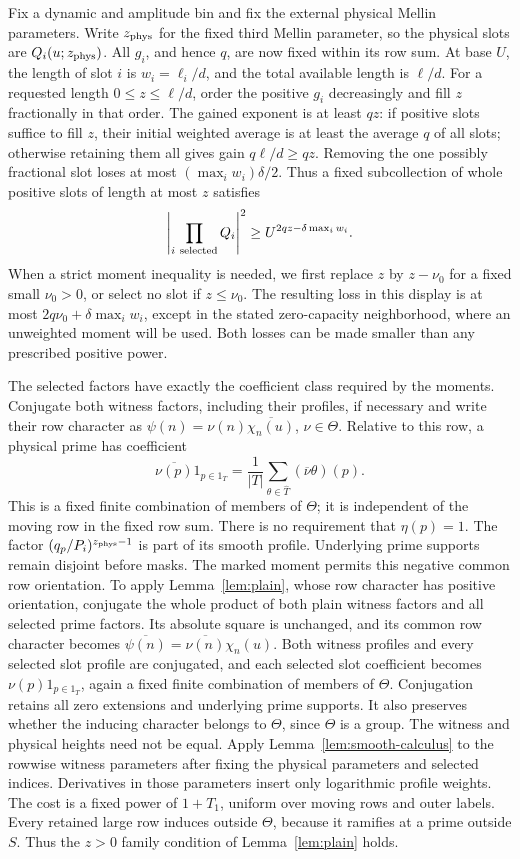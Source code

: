 \documentclass[11pt,a4paper]{article}
\numberwithin{equation}{section}
\numberwithin{figure}{section}
\theoremstyle{definition}
\theoremstyle{remark}
\begin{document}
Fix a dynamic and amplitude bin and fix the external physical
Mellin parameters.  Write \(z_{\rm phys}\) for the fixed third Mellin
parameter, so the physical slots are \(Q_i(u;z_{\rm phys})\).
All \(g_i\), and hence \(q\), are now fixed
within its row sum.  At base \(U\), the length of slot \(i\) is
\(w_i=\ell_i/d\), and the total available length is \(\ell/d\).
For a requested length \(0\le z\le\ell/d\), order the positive
\(g_i\) decreasingly and fill \(z\) fractionally in that order.
The gained exponent is at least \(qz\): if positive slots suffice
to fill \(z\), their initial weighted average is at least the
average \(q\) of all slots; otherwise retaining them all gives
gain \(q\ell/d\ge qz\).  Removing the one possibly fractional
slot loses at most \((\max_i w_i)\delta/2\).  Thus a fixed
subcollection of whole positive slots of length at most \(z\)
satisfies
\[
 \left|\prod_{i\ {\rm selected}}Q_i\right|^2
 \ge U^{2qz-\delta\max_iw_i}.
\]
When a strict moment inequality is needed, we first replace \(z\)
by \(z-\nu_0\) for a fixed small \(\nu_0>0\), or select no slot if
\(z\le\nu_0\).  The resulting loss in this display is at most
\(2q\nu_0+\delta\max_iw_i\), except in the stated zero-capacity
neighborhood, where an unweighted moment will be used.  Both losses
can be made smaller than any prescribed positive power.

The selected factors have exactly the coefficient class required
by the moments.  Conjugate both witness factors, including their
profiles, if necessary and write their row character as
\(\psi(n)=\nu(n)\overline{\chi_n(u)}\), \(\nu\in\Theta\).
Relative to this row, a physical prime has coefficient
\[
 \overline{\nu(p)}1_{p\in1_T}
 =\frac1{|T|}\sum_{\theta\in\widehat T}
       (\overline{\nu}\theta)(p).
\]
This is a fixed finite combination of members of \(\Theta\);
it is independent of the moving row in the fixed row sum.
There is no requirement that \(\eta(p)=1\).
The factor \((q_p/P_i)^{z_{\rm phys}-1}\) is part of its smooth profile.
Underlying prime supports remain disjoint before masks.
The marked moment permits this negative common row orientation.
To apply Lemma~\ref{lem:plain}, whose row character has positive
orientation, conjugate the whole product of both plain witness
factors and all selected prime factors.  Its absolute square is
unchanged, and its common row character becomes
\(\overline{\psi(n)}=\overline{\nu(n)}\chi_n(u)\).
Both witness profiles and every selected slot profile are conjugated,
and each selected slot coefficient becomes
\(\nu(p)1_{p\in1_T}\), again a fixed finite combination of members
of \(\Theta\).  Conjugation retains all zero extensions and underlying
prime supports.  It also preserves whether the inducing character
belongs to \(\Theta\), since \(\Theta\) is a group.
The witness and physical heights need not be equal.  Apply
Lemma~\ref{lem:smooth-calculus} to the rowwise witness parameters
after fixing the physical parameters and selected indices.
Derivatives in those parameters insert only logarithmic profile
weights.  The cost is a fixed power of \(1+T_1\), uniform over
moving rows and outer labels.  Every retained large row induces
outside \(\Theta\), because it ramifies at a prime outside \(S\).
Thus the \(z>0\) family condition of Lemma~\ref{lem:plain} holds.
\end{document}
